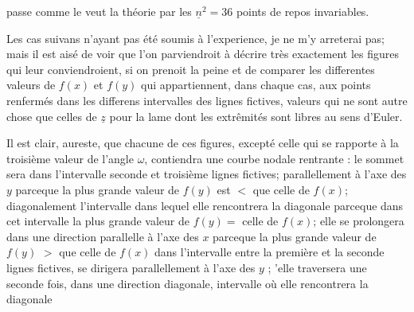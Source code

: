 \documentclass[11pt,a4paper]{article}
\begin{document}

passe comme le veut la théorie par les $\underline{n}^2 = 36$ points de
repos invariables.

Les cas suivans n'ayant pas été soumis à l'experience, je ne
m'y arreterai pas; mais il est aisé de voir que l'on parviendroit
à décrire très exactement les figures qui leur conviendroient,
si on prenoit la peine  et de comparer  les differentes
valeurs de $f(x)$ et $f(y)$ qui appartiennent, dans chaque cas,
aux points renfermés dans les differens intervalles des lignes
fictives, valeurs qui ne sont autre chose que celles de $\underline{z}$ pour
la lame dont les extrêmités sont libres au sens d'Euler.

Il est clair, aureste, que chacune de ces figures, excepté
 celle qui se rapporte à la troisième valeur de l'angle $\omega$,
contiendra une courbe nodale rentrante : le sommet 
 sera dans l'intervalle   seconde et troisième lignes fictives;
 
parallellement à l'axe des $y$ parceque la plus grande valeur
de $f(y)$ est  $<$ que celle de $f(x)$;   
diagonalement l'intervalle dans lequel elle rencontrera la diagonale
parceque dans cet intervalle la plus grande valeur de $f(y) =$ celle de $f(x)$;
 elle se prolongera dans une direction parallelle à l'axe
des $x$ parceque la plus grande valeur de $f(y)$   $>$ que celle de $f(x)$
 dans l'intervalle entre la  première et la seconde
lignes fictives,   se dirigera parallellement à l'axe des $y$ 
;  'elle traversera une seconde fois, dans une
direction diagonale,  intervalle où elle rencontrera la diagonale
\end{document}
